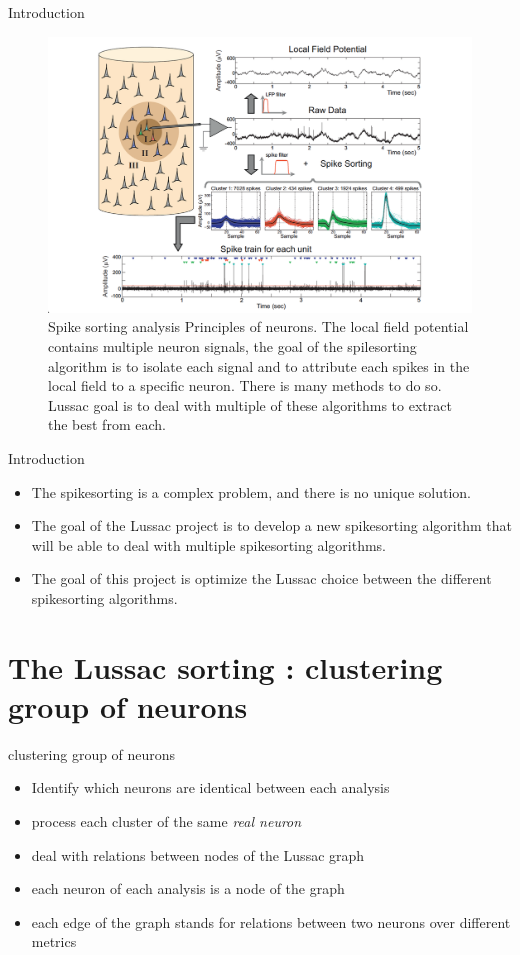 \documentclass[numbering=fraction]{beamer}
\begin{document}
\begin{frame}{Introduction}
    \begin{figure}[H]
        \begin{center}
            \includegraphics[width=0.8\linewidth]{./figure/spike.png}
        \end{center}
        \caption{\scriptsize{Spike sorting analysis Principles of neurons. The local field potential contains multiple neuron signals, the goal of the spilesorting algorithm is to
                isolate each signal and to attribute each spikes in the local field to a specific neuron. There is many methods to do so. Lussac goal is to deal with multiple of these algorithms to extract the best from each.}}
        \label{fig:}
    \end{figure}
\end{frame}
\begin{frame}{Introduction}
    \begin{itemize}
        \item The spikesorting is a complex problem, and there is no unique solution.
        \item The goal of the Lussac project is to develop a new spikesorting algorithm that will be able to deal with multiple spikesorting algorithms.
        \item The goal of this project is optimize the Lussac choice between the different spikesorting algorithms.
    \end{itemize}
\end{frame}
\section{The Lussac sorting : clustering group of neurons}
\begin{frame}{clustering group of neurons}
    \begin{itemize}
        \item  Identify which neurons are identical between each analysis
        \item process each cluster of the same \emph{real neuron}
        \item deal with relations between nodes of the Lussac graph
        \item each neuron of each analysis is a node of the graph
        \item each edge of the graph stands for relations between two neurons over different metrics
    \end{itemize}
\end{frame}
\end{document}
